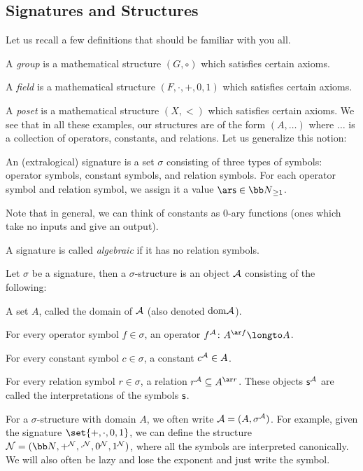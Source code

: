 \subsection{Signatures and Structures}

Let us recall a few definitions that should be familiar with you all.
\benum
    \item A {\it group} is a mathematical structure $(G,\circ)$ which satisfies certain axioms.
    \item A {\it field} is a mathematical structure $(F,\cdot,+,0,1)$ which satisfies certain
    axioms.
    \item A {\it poset} is a mathematical structure $(X,<)$ which satisfies certain axioms.
\eenum
We see that in all these examples, our structures are of the form $(A,\dots)$ where $\dots$ is a
collection of operators, constants, and relations.
Let us generalize this notion:

\bdefn

    An {\emphcolor (extralogical) signature} is a set $\sigma$ consisting of three types of
    symbols: operator symbols, constant symbols, and relation symbols.
    For each operator symbol and relation symbol, we assign it a value
    $\ar\s s\in{\bb N}_{\geq1}$.

\edefn

Note that in general, we can think of constants as $0$-ary functions (ones which take no inputs
and give an output).

A signature is called {\it algebraic} if it has no relation symbols.

\bdefn

    Let $\sigma$ be a signature, then a {\emphcolor $\sigma$-structure} is an object ${\cal A}$
    consisting of the following:
    \benum
        \item A set $A$, called the {\emphcolor domain} of ${\cal A}$ (also denoted
        ${\rm dom}{\cal A}$).
        \item For every operator symbol $f\in\sigma$, an operator
        $f^{\cal A}\colon A^{\ar f}\longto A$.
        \item For every constant symbol $c\in\sigma$, a constant $c^{\cal A}\in A$.
        \item For every relation symbol $r\in\sigma$, a relation $r^{\cal A}\subseteq A^{\ar r}$.
    \eenum
    These objects ${\sf s}^{\cal A}$ are called the {\emphcolor interpretations} of the symbols
    ${\sf s}$.

\edefn

For a $\sigma$-structure with domain $A$, we often write ${\cal A}=(A,\sigma^{\cal A})$.
For example, given the signature $\set{+,\cdot,0,1}$, we can define the structure
${\cal N}=({\bb N},+^{\cal N},\cdot^{\cal N},0^{\cal N},1^{\cal N})$, where all the symbols are
interpreted canonically.
We will also often be lazy and lose the exponent and just write the symbol.

